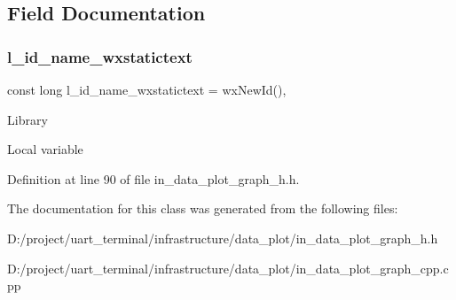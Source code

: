 \subsection{Field Documentation}
\mbox{\label{classdata__plot_a21b13634d129254d5323f79dea203b5d}} 
\subsubsection{l\_id\_name\_wxstatictext}
{\footnotesize\ttfamily const long l\+\_\+id\+\_\+name\+\_\+wxstatictext = wx\+New\+Id()\hspace{0.3cm}{\ttfamily [static]}, {\ttfamily [protected]}}

Library

Local variable 

Definition at line 90 of file in\+\_\+data\+\_\+plot\+\_\+graph\+\_\+h.\+h.



The documentation for this class was generated from the following files\+:\begin{DoxyCompactItemize}
\item 
D\+:/project/uart\+\_\+terminal/infrastructure/data\+\_\+plot/in\+\_\+data\+\_\+plot\+\_\+graph\+\_\+h.\+h\item 
D\+:/project/uart\+\_\+terminal/infrastructure/data\+\_\+plot/in\+\_\+data\+\_\+plot\+\_\+graph\+\_\+cpp.\+cpp\end{DoxyCompactItemize}
